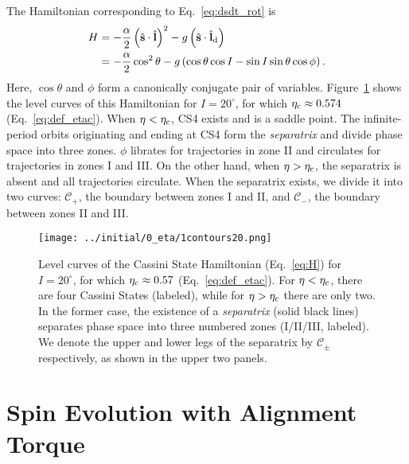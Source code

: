 \documentclass[
        fleqn,
        usenatbib,
    ]{mnras}
\newcommand*{\p}[1]{\left(#1\right)}
\newcommand*{\uv}[1]{\hat{\boldsymbol{\mathbf{#1}}}}
\begin{document}
The Hamiltonian corresponding to Eq.~\eqref{eq:dsdt_rot} is
\begin{align}
    H &= -\frac{\alpha}{2}\p{\uv{s} \cdot \uv{l}}^2
            - g\p{\uv{s} \cdot \uv{l}_{\rm d}}\nonumber\\
        &= -\frac{\alpha}{2} \cos^2\theta
            - g\p{\cos\theta \cos I - \sin I \sin\theta \cos \phi}.\label{eq:H}
\end{align}
Here, $\cos \theta$ and $\phi$ form a canonically conjugate pair of variables.
Figure~\ref{fig:1contours} shows the level curves of this Hamiltonian for $I =
20^\circ$, for which $\eta_{\rm c} \approx 0.574$ (Eq.~\ref{eq:def_etac}). When $\eta
< \eta_{\rm c}$, CS4 exists and is a saddle point. The infinite-period orbits
originating and ending at CS4 form the \emph{separatrix} and divide phase space
into three zones. $\phi$ librates for trajectories in zone II and circulates for
trajectories in zones I and III\@. On the other hand, when $\eta > \eta_{\rm
c}$, the separatrix is absent and all trajectories circulate. When the
separatrix exists, we divide it into two curves: $\mathcal{C}_+$, the boundary
between zones I and II, and $\mathcal{C}_-$, the boundary between zones II and
III\@.
\begin{figure}
    \centering
    \texttt{[image: ../initial/0\_eta/1contours20.png]}
    \caption{Level curves of the Cassini State Hamiltonian (Eq.~\ref{eq:H}) for
    $I = 20^\circ$, for which $\eta_{\rm c} \approx 0.57$
    (Eq.~\ref{eq:def_etac}). For $\eta < \eta_{\rm c}$, there are four Cassini
    States (labeled), while for $\eta > \eta_{\rm c}$ there are only two. In the
    former case, the existence of a \emph{separatrix} (solid black lines)
    separates phase space into three numbered zones (I/II/III, labeled). We
    denote the upper and lower legs of the separatrix by $\mathcal{C}_{\pm}$
    respectively, as shown in the upper two panels. }\label{fig:1contours}
\end{figure}

\section{Spin Evolution with Alignment Torque}\label{s:toy_model}
\end{document}
